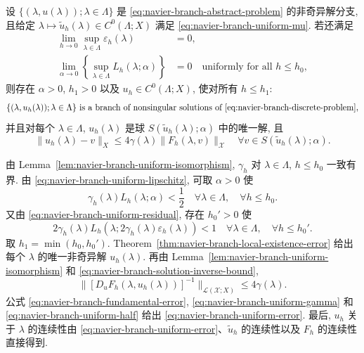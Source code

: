 \setcounter{statement}{1}
\begin{Theorem}\label{thm:navier-branch-uniform-branch}
设 $\{(\lambda,u(\lambda));\lambda\in\Lambda\}$ 是
\eqref{eq:navier-branch-abstract-problem} 的非奇异解分支, 且给定
$\lambda\mapsto\widetilde u_h(\lambda)\in C^0(\Lambda;X)$ 满足
\eqref{eq:navier-branch-uniform-mu}. 若还满足
\begin{align}
\lim_{h\to0}\sup_{\lambda\in\Lambda}\varepsilon_h(\lambda)&=0,
\label{eq:navier-branch-uniform-residual}\\
\lim_{\alpha\to0}\left\{\sup_{\lambda\in\Lambda}L_h(\lambda;\alpha)\right\}&=0
\quad\text{uniformly for all }h\leq h_0,
\label{eq:navier-branch-uniform-lipschitz}
\end{align}
则存在 $\alpha>0$, $h_1>0$ 以及 $u_h\in C^0(\Lambda;X)$, 使对所有
$h\leq h_1$:
\begin{equation}\label{eq:navier-branch-uniform-nonsingular-branch}
\{(\lambda,u_h(\lambda));\lambda\in\Lambda\}
\text{ is a branch of nonsingular solutions of }
\eqref{eq:navier-branch-discrete-problem},
\end{equation}
并且对每个 $\lambda\in\Lambda$, $u_h(\lambda)$ 是球
$S(\widetilde u_h(\lambda);\alpha)$ 中的唯一解, 且
\begin{equation}\label{eq:navier-branch-uniform-error}
\|u_h(\lambda)-v\|_X
\leq4\gamma(\lambda)\|F_h(\lambda,v)\|_{\mathscr X}
\quad\forall v\in S(\widetilde u_h(\lambda);\alpha).
\end{equation}
\end{Theorem}
\begin{Proof}
由 Lemma~\ref{lem:navier-branch-uniform-isomorphism}, $\gamma_h$ 对
$\lambda\in\Lambda$, $h\leq h_0$ 一致有界. 由
\eqref{eq:navier-branch-uniform-lipschitz}, 可取 $\alpha>0$ 使
\begin{equation}\label{eq:navier-branch-uniform-half}
\gamma_h(\lambda)L_h(\lambda;\alpha)<\frac12
\quad\forall\lambda\in\Lambda,\quad\forall h\leq h_0.
\end{equation}
又由 \eqref{eq:navier-branch-uniform-residual}, 存在 $h_0'>0$ 使
\[
2\gamma_h(\lambda)L_h(\lambda;2\gamma_h(\lambda)\varepsilon_h(\lambda))<1
\quad\forall\lambda\in\Lambda,\quad\forall h\leq h_0'.
\]
取 $h_1=\min(h_0,h_0')$. Theorem~\ref{thm:navier-branch-local-existence-error}
给出每个 $\lambda$ 的唯一非奇异解 $u_h(\lambda)$.
再由 Lemma~\ref{lem:navier-branch-uniform-isomorphism} 和
\eqref{eq:navier-branch-solution-inverse-bound},
\begin{equation}\label{eq:navier-branch-uniform-solution-inverse}
\|[D_uF_h(\lambda,u_h(\lambda))]^{-1}\|_{\mathcal L(\mathscr X;X)}
\leq4\gamma(\lambda).
\end{equation}
公式 \eqref{eq:navier-branch-fundamental-error},
\eqref{eq:navier-branch-uniform-gamma} 和
\eqref{eq:navier-branch-uniform-half} 给出
\eqref{eq:navier-branch-uniform-error}. 最后, $u_h$ 关于 $\lambda$ 的连续性由
\eqref{eq:navier-branch-uniform-error}、$\widetilde u_h$ 的连续性以及 $F_h$ 的连续性直接得到.
\end{Proof}

